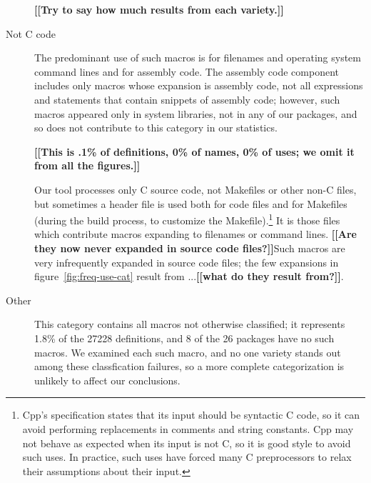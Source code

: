\documentclass[10pt]{article}
\newcommand{\comment}[1]{\textbf{[[#1]]}}
\def\numpackages{26}
\def\nummacrodefs{27228}        %
\begin{document}
\begin{description}
  \comment{Try to say how much results from each variety.}

\item[Not C code]\label{page:not-c-code}
  The predominant use of such macros is for filenames and operating system
  command lines and for assembly code.  The assembly code component
  includes only macros whose expansion is assembly code, not all
  expressions and statements that contain snippets of assembly code;
  however, such macros appeared only in system libraries, not in any of our
  packages, and so does not contribute to this category in our statistics.
  
  \comment{This is .1\% of definitions, 0\% of names, 0\% of uses; we omit
  it from all the figures.}

  Our tool processes only C source code, not Makefiles or other non-C
  files, but sometimes a header file is used both for code files and for
  Makefiles (during the build process, to customize the
  Makefile).\footnote{Cpp's specification states that its input should be
    syntactic C code, so it can avoid performing replacements in comments
    and string constants.  Cpp may not behave as expected when its input is
    not C, so it is good style to avoid such uses.  In practice, such uses
    have forced many C preprocessors to relax their assumptions about their
    input.}  It is those files which contribute macros expanding to
  filenames or command lines.  \comment{Are they now never expanded in
  source code files?}Such macros are very infrequently expanded
  in source code files; the few expansions in figure~\ref{fig:freq-use-cat}
  result from ...\comment{what do they result from?}.
  

\item[Other]
  This category contains all macros not otherwise classified; it represents
  1.8\% of the {\nummacrodefs} definitions, and 8 of the {\numpackages}
  packages have no such macros.  We examined each such macro, and no one
  variety stands out among these classfication failures, so a more complete
  categorization is unlikely to affect our conclusions.
  

\end{description}
\end{document}
